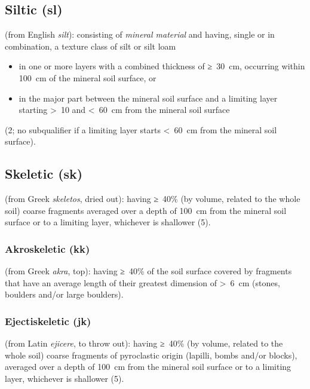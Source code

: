 \documentclass[
  letterpaper,
  DIV=11,
  numbers=noendperiod]{scrreprt}
\providecommand{\tightlist}{%
  \setlength{\itemsep}{0pt}\setlength{\parskip}{0pt}}\usepackage{longtable,booktabs,array}
\begin{document}
\hypertarget{siltic-sl}{%
\subsection{Siltic (sl)}\label{siltic-sl}}

(from English \emph{silt}): consisting of \emph{mineral material} and
having, single or in combination, a texture class of silt or silt loam

\begin{itemize}
\tightlist
\item
  in one or more layers with a combined thickness of ≥~30~cm, occurring
  within 100~cm of the mineral soil surface, or
\item
  in the major part between the mineral soil surface and a limiting
  layer starting \textgreater~10 and \textless~60~cm from the mineral
  soil surface
\end{itemize}

(2; no subqualifier if a limiting layer starts \textless~60~cm from the
mineral soil surface).

\hypertarget{skeletic-sk}{%
\subsection{Skeletic (sk)}\label{skeletic-sk}}

(from Greek \emph{skeletos}, dried out): having ≥~40\% (by volume,
related to the whole soil) coarse fragments averaged over a depth of
100~cm from the mineral soil surface or to a limiting layer, whichever
is shallower (5).

\hypertarget{akroskeletic-kk}{%
\subsubsection{Akroskeletic (kk)}\label{akroskeletic-kk}}

(from Greek \emph{akra}, top): having ≥~40\% of the soil surface covered
by fragments that have an average length of their greatest dimension of
\textgreater~6~cm (stones, boulders and/or large boulders).

\hypertarget{ejectiskeletic-jk}{%
\subsubsection{Ejectiskeletic (jk)}\label{ejectiskeletic-jk}}

(from Latin \emph{ejicere}, to throw out): having ≥~40\% (by volume,
related to the whole soil) coarse fragments of pyroclastic origin
(lapilli, bombs and/or blocks), averaged over a depth of 100~cm from the
mineral soil surface or to a limiting layer, whichever is shallower (5).
\end{document}
